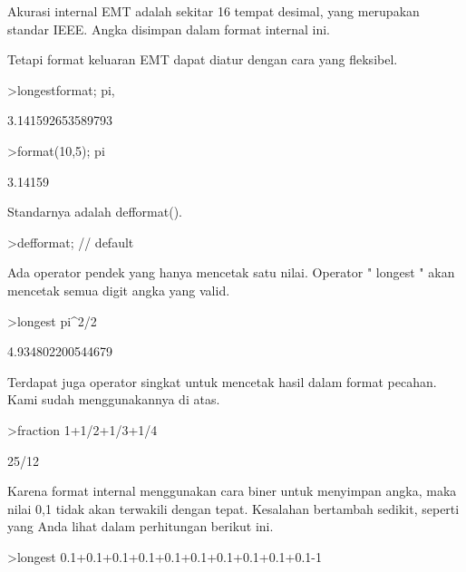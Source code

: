 \documentclass[a4paper,10pt]{article}
\begin{document}
\begin{eulernotebook}
\begin{eulercomment}
Akurasi internal EMT adalah sekitar 16 tempat desimal, yang merupakan
standar IEEE. Angka disimpan dalam format internal ini.

Tetapi format keluaran EMT dapat diatur dengan cara yang fleksibel.
\end{eulercomment}
\begin{eulerprompt}
>longestformat; pi,
\end{eulerprompt}
\begin{euleroutput}
  3.141592653589793
\end{euleroutput}
\begin{eulerprompt}
>format(10,5); pi
\end{eulerprompt}
\begin{euleroutput}
    3.14159 
\end{euleroutput}
\begin{eulercomment}
Standarnya adalah defformat().
\end{eulercomment}
\begin{eulerprompt}
>defformat; // default
\end{eulerprompt}
\begin{eulercomment}
Ada operator pendek yang hanya mencetak satu nilai. Operator " longest
" akan mencetak semua digit angka yang valid.
\end{eulercomment}
\begin{eulerprompt}
>longest pi^2/2
\end{eulerprompt}
\begin{euleroutput}
        4.934802200544679 
\end{euleroutput}
\begin{eulercomment}
Terdapat juga operator singkat untuk mencetak hasil dalam format
pecahan. Kami sudah menggunakannya di atas.
\end{eulercomment}
\begin{eulerprompt}
>fraction 1+1/2+1/3+1/4
\end{eulerprompt}
\begin{euleroutput}
  25/12
\end{euleroutput}
\begin{eulercomment}
Karena format internal menggunakan cara biner untuk menyimpan angka,
maka nilai 0,1 tidak akan terwakili dengan tepat. Kesalahan bertambah
sedikit, seperti yang Anda lihat dalam perhitungan berikut ini.
\end{eulercomment}
\begin{eulerprompt}
>longest 0.1+0.1+0.1+0.1+0.1+0.1+0.1+0.1+0.1+0.1-1
\end{eulerprompt}

\end{eulernotebook}
\end{document}
